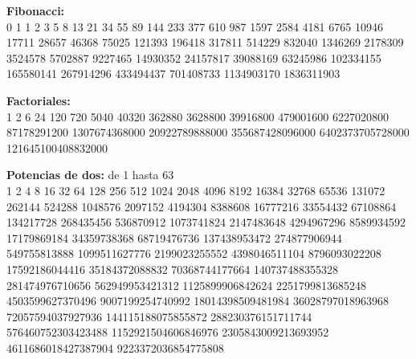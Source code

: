 \documentclass[10pt,landscape,twocolumn,a4paper,notitlepage]{article}
\begin{document}
	\vspace{8mm}
	\textbf{Fibonacci:}\\
	\vspace{3mm}
	0 1 1 2 3 5 8 13 21 34 55 89 144 233 377 610 987 1597 2584 4181 6765 10946 17711 28657 46368 75025 121393 196418 317811
	514229 832040 1346269 2178309 3524578 5702887 9227465 14930352 24157817 39088169 63245986 102334155 165580141 267914296
	433494437 701408733 1134903170 1836311903
	
	\vspace{8mm}
	\textbf{Factoriales:}\\
	\vspace{3mm}
	1 2 6 24 120 720 5040 40320 362880 3628800 39916800 479001600 6227020800 87178291200 1307674368000 20922789888000
	355687428096000 6402373705728000 121645100408832000
	
	\vspace{8mm}
	\textbf{Potencias de dos:} de 1 hasta 63\\
	\vspace{3mm}
	1 2 4 8 16 32 64 128 256 512 1024 2048 4096 8192 16384 32768 65536 131072 262144 524288 1048576 2097152 4194304 8388608
	16777216 33554432 67108864 134217728 268435456 536870912 1073741824 2147483648 4294967296 8589934592 17179869184
	34359738368 68719476736 137438953472 274877906944 549755813888 1099511627776 2199023255552 4398046511104 8796093022208
	17592186044416 35184372088832 70368744177664 140737488355328 281474976710656 562949953421312 1125899906842624
	2251799813685248 4503599627370496 9007199254740992 18014398509481984 36028797018963968 72057594037927936
	144115188075855872 288230376151711744 576460752303423488 1152921504606846976 2305843009213693952 4611686018427387904
	9223372036854775808
\end{document}
